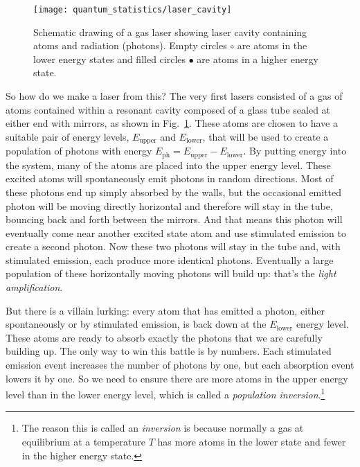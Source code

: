 \begin{figure}
\begin{center}
\texttt{[image: quantum\_statistics/laser\_cavity]}
\caption{Schematic drawing of a gas laser showing laser cavity
  containing atoms and radiation (photons). Empty circles $\circ$ are
  atoms in the lower energy states and filled circles $\bullet$ are
  atoms in a higher energy state.}
\label{fig:laser_cavity}
\end{center}
\end{figure}

So how do we make a laser from this?  The very first lasers consisted
of a gas of atoms contained within a resonant cavity composed of a
glass tube sealed at either end with mirrors, as shown in
Fig.~\ref{fig:laser_cavity}.  These atoms are chosen to have a
suitable pair of energy levels, $E_\text{upper}$ and $E_\text{lower}$,
that will be used to create a population of photons with energy
$E_\text{ph}=E_\text{upper}-E_\text{lower}$. By putting energy into
the system, many of the atoms are placed into the upper energy level.
These excited atoms will spontaneously emit photons in random
directions.  Most of these photons end up simply absorbed by the
walls, but the occasional emitted photon will be moving directly
horizontal and therefore will stay in the tube, bouncing back and
forth between the mirrors.  And that means this photon will eventually
come near another excited state atom and use stimulated emission to
create a second photon.  Now these two photons will stay in the tube
and, with stimulated emission, each produce more identical photons.
Eventually a large population of these horizontally moving photons
will build up: that's the \textit{light amplification}.


But there is a villain lurking:
every atom that has emitted a photon, either spontaneously or
by stimulated emission, is back down at the $E_\text{lower}$ energy
level.  These atoms are ready to absorb exactly the photons that
we are carefully building up.  The only way to win this battle is by
numbers.  Each stimulated emission event increases the number of
photons by one, but each absorption event lowers it by one.  So we
need to ensure there are more atoms in the upper energy level than in
the lower energy level, which is called a \textit{population
  inversion}.\footnote{The reason this is called an {\it inversion} is
  because normally a gas at equilibrium at a temperature $T$ has more
  atoms in the lower state and fewer in the higher energy state.}

